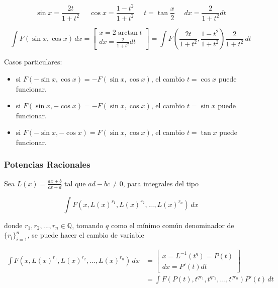 \begin{minipage}{0.55\textwidth}
\begin{equation}
    \sin{x}=\frac{2t}{1+t^2}\,\,\,\,\,\,\,\,
    \cos{x}=\frac{1-t^2}{1+t^2}\,\,\,\,\,\,\,\,
    t=\tan{\frac{x}{2}}\,\,\,\,\,\,\,\,
    dx=\frac{2}{1+t^2}dt
\nonumber
\end{equation}
\end{minipage}

\[\int F(\sin{x}, \cos{x})\,dx = 
\begin{bmatrix}
x = 2\arctan{t}\\
dx=\frac{2}{1+t^2}dt
\end{bmatrix}
= \int F\left(\frac{2t}{1+t^2},\frac{1-t^2}{1+t^2}\right)
\frac{2}{1+t^2}\,dt\]

Casos particulares:

\begin{itemize}
    \item si $F(-\sin{x}, \cos{x}) = -F(\sin{x}, \cos{x})$, el cambio $t = \cos{x}$ puede funcionar.
    \item si $F(\sin{x}, -\cos{x}) = -F(\sin{x}, \cos{x})$, el cambio $t = \sin{x}$ puede funcionar.
    \item si $F(-\sin{x}, -\cos{x}) = F(\sin{x}, \cos{x})$, el cambio $t = \tan{x}$ puede funcionar.
\end{itemize}

\subsubsection{Potencias Racionales}

Sea $L(x) = \frac{ax+b}{cx+d}$ tal que $ad-bc\neq 0$, para integrales del tipo

\[\int F(x, L(x)^{r_1}, L(x)^{r_2}, ..., L(x)^{r_n})\,dx\]

donde $r_1, r_2, ..., r_n \in \mathbb{Q}$, tomando $q$ como el mínimo común denominador de $\{r_i\}_{i=1}^n$, se puede hacer el cambio de variable

\begin{equation}
\begin{split}
\int F(x, L(x)^{r_1}, L(x)^{r_2}, ..., L(x)^{r_n})\,dx & =
\begin{bmatrix}
x = L^{-1}(t^q) = P(t)\\
dx=P'(t)dt
\end{bmatrix}\\ & =
\int F(P(t), t^{qr_1}, t^{qr_2}, ..., t^{qr_n})P'(t)\,dt
\end{split}
\nonumber
\end{equation}

